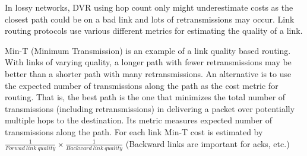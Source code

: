 \documentclass[12pt]{article}
\begin{document}
In lossy networks, DVR using hop count only might underestimate costs as the
closest path could be on a bad link and lots of retransmissions may occur.
Link routing protocols use various different metrics for estimating the quality
of a link.

Min-T (Minimum Transmission) is an example of a link quality based routing.
With links of varying quality, a longer path with fewer retransmissions may be
better than a shorter path with many retransmissions. An alternative is to use
the expected number of  transmissions along the path as the cost metric for
routing. That is, the best path is the one that minimizes the total number of
transmissions (including retransmissions) in delivering a packet over
potentially multiple hops to the destination.  Its metric measures expected
number of transmissions along the path. For each link Min-T cost is estimated
by $\frac{1}{Forwad~link~quality} \times \frac{1}{Backward~link~quality}$
(Backward links are important for acks, etc.)
\end{document}

